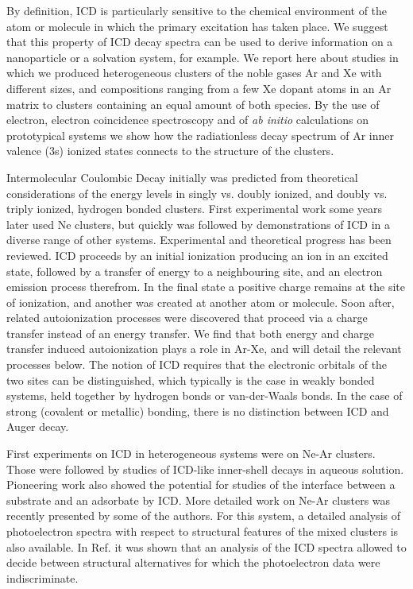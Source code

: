 \documentclass[journal=jpccck,manuscript=article]{achemso}
\begin{document}
By definition, ICD is particularly sensitive to the chemical environment of the atom or molecule in which the primary excitation has taken place. We suggest that this property of ICD decay spectra can be used to derive information on a nanoparticle or a solvation system, for example. We report here about studies in which we produced heterogeneous clusters of the noble gases Ar and Xe with different sizes, and compositions ranging from a few Xe dopant atoms in an Ar matrix to clusters containing an equal amount of both species. By the use of electron, electron coincidence spectroscopy and of {\it ab initio} calculations on prototypical systems we show how the radiationless decay spectrum of Ar inner valence (3s) ionized states connects to the structure of the clusters.

Intermolecular Coulombic Decay initially was predicted from theoretical considerations of the energy levels in singly vs. doubly ionized, and doubly vs. triply ionized, hydrogen bonded clusters.\cite{cederbaum} First experimental work some years later used Ne clusters,\cite{marburger,jahnkenedimer} but quickly was followed by demonstrations of ICD in a diverse range of other systems. Experimental and theoretical progress has been reviewed.\cite{hergenhahn_review, averbukh_review, jahnke_review} ICD proceeds by an initial ionization producing an ion in an excited state, followed by a transfer of energy to a neighbouring site, and an electron emission process therefrom. In the final state a positive charge remains at the site of ionization, and another was created at another atom or molecule. Soon after, related autoionization processes were discovered that proceed via a charge transfer instead of an energy transfer. 
We find that both energy and charge transfer induced autoionization plays a role in Ar-Xe, and will detail the relevant processes below. The notion of ICD requires that the electronic orbitals of the two sites can be distinguished, which typically is the case in weakly bonded systems, held together by hydrogen bonds or van-der-Waals bonds. In the case of strong (covalent or metallic) bonding, there is no distinction between ICD and Auger decay.\cite{hergenhahn_review}

First experiments on ICD in heterogeneous systems were on Ne-Ar clusters.\cite{barthnear} Those were followed by studies of ICD-like inner-shell decays in aqueous solution.\cite{aziz,pokapanich,pokapanich2011} Pioneering work also showed the potential for studies of the interface between a substrate and an adsorbate by ICD.\cite{grieves} More detailed work on Ne-Ar clusters was recently presented by some of the authors.\cite{fasshauer2014} For this system, a detailed analysis of photoelectron spectra with respect to structural features of the mixed clusters is also available.\cite{lundwall} In Ref.  it was shown that an analysis of the ICD spectra allowed to decide between structural alternatives for which the photoelectron data were indiscriminate.
\end{document}
